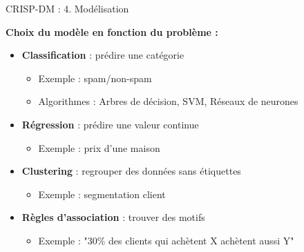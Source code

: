 \begin{frame}{CRISP-DM : 4. Modélisation}

\textbf{Choix du modèle en fonction du problème :}

\vspace{0.3cm}

\begin{itemize}
    \item<+-> \textbf{Classification} : prédire une catégorie
        \begin{itemize}
            \item Exemple : spam/non-spam
            \item Algorithmes : Arbres de décision, SVM, Réseaux de neurones
        \end{itemize}

    \vspace{0.2cm}
    \item<+-> \textbf{Régression} : prédire une valeur continue
        \begin{itemize}
            \item Exemple : prix d'une maison
        \end{itemize}

    \vspace{0.2cm}
    \item<+-> \textbf{Clustering} : regrouper des données sans étiquettes
        \begin{itemize}
            \item Exemple : segmentation client
        \end{itemize}

    \vspace{0.2cm}
    \item<+-> \textbf{Règles d'association} : trouver des motifs
        \begin{itemize}
            \item Exemple : "30\% des clients qui achètent X achètent aussi Y"
        \end{itemize}
\end{itemize}

\end{frame}

